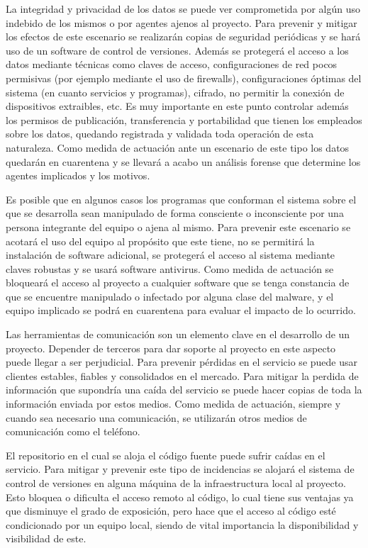La integridad y privacidad de los datos se puede ver comprometida por algún uso indebido de los mismos o por agentes ajenos al proyecto. Para prevenir y mitigar los efectos de este escenario 
se realizarán copias de seguridad  periódicas y se hará uso de un software de control de versiones. Además se protegerá el acceso a los datos mediante técnicas como claves de acceso, configuraciones de red pocos permisivas
(por ejemplo mediante el uso de firewalls), configuraciones óptimas del sistema (en cuanto servicios y programas), cifrado, no permitir la conexión de dispositivos extraibles, etc. Es muy importante en este punto 
controlar además los permisos de publicación, transferencia y portabilidad que tienen los empleados sobre los datos, quedando registrada y validada toda operación de esta naturaleza. Como medida de
actuación ante un escenario de este tipo los datos quedarán en cuarentena y se llevará a acabo un análisis forense que determine los agentes implicados y los motivos.

Es posible que en algunos casos los programas que conforman el sistema sobre el que se desarrolla sean manipulado de forma consciente o inconsciente por una persona integrante del equipo o ajena 
al mismo. Para prevenir este escenario se acotará el uso del equipo al propósito que este tiene, no se permitirá la instalación de software adicional, se protegerá el acceso al sistema mediante claves robustas y se 
usará software antivirus. Como medida de actuación se bloqueará el acceso al proyecto a cualquier software que se tenga constancia de que se encuentre manipulado o infectado por alguna clase del 
malware, y el equipo implicado se podrá en cuarentena para evaluar el impacto de lo ocurrido.  

Las herramientas de comunicación son un elemento clave en el desarrollo de un proyecto. Depender de terceros para dar soporte al proyecto en este aspecto puede llegar a ser perjudicial. Para 
prevenir pérdidas en el servicio se puede usar clientes estables, fiables y consolidados en el mercado. Para mitigar la perdida de información que supondría una caída del servicio se puede hacer
copias de toda la información enviada por estos medios. Como medida de actuación, siempre y cuando sea necesario una comunicación, se utilizarán otros medios de comunicación como el teléfono. 

El repositorio en el cual se aloja el código fuente puede sufrir caídas en el servicio. Para mitigar y prevenir este tipo de incidencias se alojará el sistema de control de versiones en alguna
máquina de la infraestructura local al proyecto. Esto bloquea o dificulta el acceso remoto al código, lo cual tiene sus ventajas ya que disminuye el grado de exposición, pero hace que el acceso 
al código esté condicionado por un equipo local, siendo de vital importancia la disponibilidad y visibilidad de este. 

